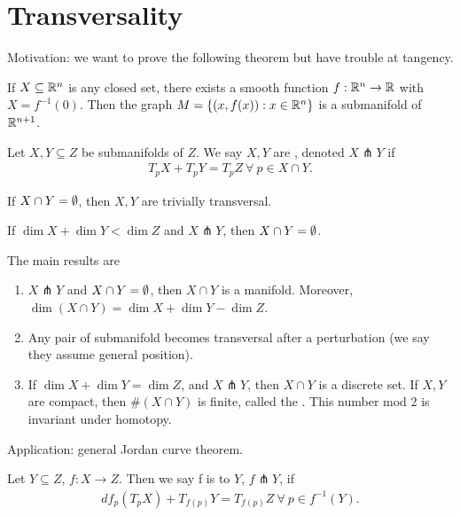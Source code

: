 \documentclass[12pt,class=article,crop=false]{standalone}
\begin{document}
\section{Transversality}

Motivation: we want to prove the following theorem but have trouble at tangency.
\begin{thm}[Whitney]
If $ X \subseteq \mathbb{R}^{n}$ is any closed set, there exists a smooth function $ f: \mathbb{R}^{n} \to \mathbb{R}$ with $ X= f^{-1}(0)$. Then the graph $ M = \{(x,f(x)): x \in \mathbb{R}^{n}\} $ is a submanifold of $ \mathbb{R}^{n+1}$. 
\end{thm}

\begin{defn}
Let $ X,Y \subseteq Z$ be submanifolds of $ Z$. We say $ X,Y$ are  , denoted $ X \pitchfork Y$ if
 \begin{align*}
	T_p X + T_p Y = T_p Z \ \forall \ p \in X \cap Y.
\end{align*}
\end{defn}

\begin{remark}
If $ X \cap Y = \emptyset$, then $ X,Y$ are trivially transversal.

If $ \dim X + \dim Y < \dim Z$ and $ X \pitchfork Y$, then  $ X \cap Y = \emptyset$.
\end{remark}

The main results are
\begin{enumerate}[label=(\arabic*)]
	\item $ X \pitchfork Y$ and $ X \cap Y = \emptyset$, then $ X \cap Y$ is a manifold. Moreover, $ \dim (X \cap Y) = \dim X + \dim Y - \dim Z$.
	\item Any pair of submanifold becomes transversal after a perturbation (we say they assume general position).
	\item If $ \dim X + \dim Y = \dim Z$, and $ X \pitchfork Y$, then $ X \cap Y$ is a discrete set. If $ X,Y$ are compact, then  $ \#(X \cap Y)$ is finite, called the  . This number mod 2 is invariant under homotopy. 
\end{enumerate}

Application: general Jordan curve theorem. 

\begin{defn}
Let $ Y \subseteq Z$, $ f: X \to Z$. Then we say f is   to $ Y$,  $ f \pitchfork Y$, if
\begin{align*}
	df_p(T_p X) + T_{f(p)} Y = T_{f(p)} Z \ \forall \ p \in f^{-1}(Y).
\end{align*}
\end{defn}
\end{document}
